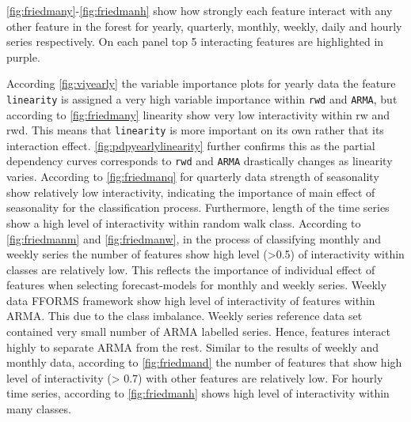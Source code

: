 \documentclass[11pt,a4paper,]{article}
\begin{document}
\autoref{fig:friedmany}-\autoref{fig:friedmanh} show how strongly each feature interact with any other feature in the forest for yearly, quarterly, monthly, weekly, daily and hourly series respectively. On each panel top 5 interacting features are highlighted in purple.

According \autoref{fig:viyearly} the variable importance plots for yearly data the feature \texttt{linearity} is assigned a very high variable importance within \texttt{rwd} and \texttt{ARMA}, but according to \autoref{fig:friedmany} linearity show very low interactivity within rw and rwd. This means that \texttt{linearity} is more important on its own rather that its interaction effect. \autoref{fig:pdpyearlylinearity} further confirms this as the partial dependency curves corresponds to \texttt{rwd} and \texttt{ARMA} drastically changes as linearity varies. According to \autoref{fig:friedmanq} for quarterly data strength of seasonality show relatively low interactivity, indicating the importance of main effect of seasonality for the classification process. Furthermore, length of the time series show a high level of interactivity within random walk class. According to \autoref{fig:friedmanm} and \autoref{fig:friedmanw}, in the process of classifying monthly and weekly series the number of features show high level (\textgreater{}0.5) of interactivity within classes are relatively low. This reflects the importance of individual effect of features when selecting forecast-models for monthly and weekly series. Weekly data FFORMS framework show high level of interactivity of features within ARMA. This due to the class imbalance. Weekly series reference data set contained very small number of ARMA labelled series. Hence, features interact highly to separate ARMA from the rest. Similar to the results of weekly and monthly data, according to \autoref{fig:friedmand} the number of features that show high level of interactivity (\textgreater{} 0.7) with other features are relatively low. For hourly time series, according to \autoref{fig:friedmanh} shows high level of interactivity within many classes.
\end{document}
